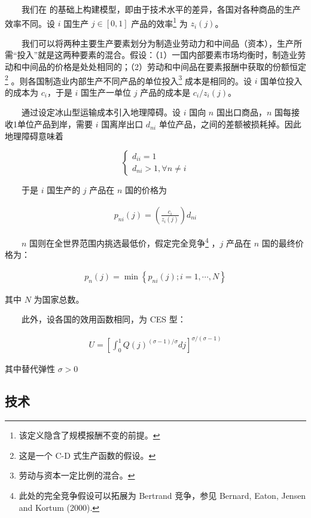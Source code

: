 \documentclass[]{article}
\let\rmarkdownfootnote\footnote%
\def\footnote{\protect\rmarkdownfootnote}
\begin{document}
　　我们在 \citet{DFS1977} 的基础上构建模型，即由于技术水平的差异，各国对各种商品的生产效率不同。设 \(i\) 国生产 \(j\in[0,1]\) 产品的效率\footnote{该定义隐含了规模报酬不变的前提。} 为 \(z_i(j)\)。

　　我们可以将两种主要生产要素划分为制造业劳动力和中间品（资本），生产所需``投入''就是这两种要素的混合。假设：（1）一国内部要素市场均衡时，制造业劳动和中间品的价格是处处相同的；（2）劳动和中间品在要素报酬中获取的份额恒定\footnote{这是一个 C-D 式生产函数的假设。} 。则各国制造业内部生产不同产品的单位投入\footnote{劳动与资本一定比例的混合。} 成本是相同的。设 \(i\) 国单位投入的成本为 \(c_i\)，于是 \(i\) 国生产一单位 \(j\) 产品的成本是 \({c_i}/{z_i(j)}\)。

　　通过设定冰山型运输成本引入地理障碍。设 \(i\) 国向 \(n\) 国出口商品，\(n\) 国每接收1单位产品到岸，需要 \(i\) 国离岸出口 \(d_{ni}\) 单位产品，之间的差额被损耗掉。因此地理障碍意味着

\[
\left\{\begin{array}{c}{d_{i i}=1} \\ {d_{n i}>1, \forall n \neq i}\end{array}\right.
\]

　　于是 \(i\) 国生产的 \(j\) 产品在 \(n\) 国的价格为

\begin{align}
p_{ni}(j)=(\frac {c_i}{z_i(j)})d_{ni} \label{eq:1}
\end{align}

　　\(n\) 国则在全世界范围内挑选最低价，假定完全竞争\footnote{此处的完全竞争假设可以拓展为 Bertrand 竞争，参见 Bernard, Eaton, Jensen and Kortum (2000).} ，\(j\) 产品在 \(n\) 国的最终价格为：

\begin{align}
p_{n}(j)=\min \left\{p_{n i}(j) ; i=1, \cdots, N\right\}  \label{eq:2}
\end{align}

其中 \(N\) 为国家总数。

　　此外，设各国的效用函数相同，为 CES 型：

\begin{align}
U=\left[\int_{0}^{1} Q(j)^{(\sigma-1) / \sigma} d j\right]^{\sigma /(\sigma-1)} \label{eq:3}
\end{align}

其中替代弹性 \(\sigma>0\)

\hypertarget{section-6}{%
\subsection{技术}\label{section-6}}
\end{document}
